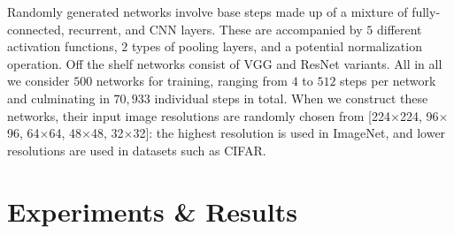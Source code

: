\documentclass[12pt]{report}
\begin{document}
Randomly generated networks involve base steps made up of a mixture of fully-connected, recurrent, and CNN layers.
These are accompanied by $5$ different activation functions, $2$ types of pooling layers,
and a potential normalization operation.
Off the shelf networks consist of VGG and ResNet variants.
All in all we consider $500$ networks for training,
ranging from $4$ to $512$ steps per network and culminating in
$70,933$ individual steps in total.
When we construct these networks, their input image resolutions are randomly chosen from
[224$\times$224, 96$\times$96, 64$\times$64, 48$\times$48, 32$\times$32]: the highest resolution
is used in ImageNet, and lower resolutions are used in datasets such as CIFAR.

\section{Experiments \& Results}\label{sec:snoop_exp}


\begin{table}[t]
\vspace{-1mm}
\centering
\caption{Classification accuracy of network steps (Titan V) \label{tab:classify1}}
\vspace{1mm}
\vspace{-3mm}
\end{table}
\end{document}
